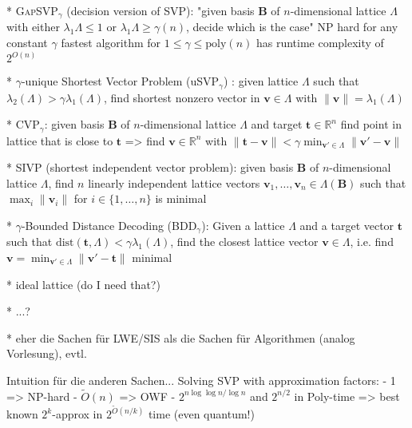 \documentclass[
  a4paper,  %
  twoside,  %
  bibliography=totoc,
  headsepline,
  cleardoublepage=empty,
  parskip=half,
  draft=false
]{scrbook}
\begin{document}
  * \textsc{GapSVP}$_\gamma$ (decision version of \textsc{SVP}): "given basis $\mathbf{B}$ of $n$-dimensional lattice $\Lambda$ with either $\lambda_1{\Lambda} \leq 1$ or $\lambda_1{\Lambda} \geq \gamma(n)$, decide which is the case" %
    NP hard for any constant $\gamma$ %
    fastest algorithm for $1\leq \gamma \leq \text{poly}(n)$ has runtime complexity of $2^{O(n)}$
  
  * $\gamma$-unique Shortest Vector Problem (uSVP$_\gamma$) \cite{LM09}: given lattice $\Lambda$ such that $\lambda_2(\Lambda) > \gamma \lambda_1(\Lambda)$, find shortest nonzero vector in $\mathbf{v} \in \Lambda$ with $\|\mathbf{v}\| = \lambda_1(\Lambda)$

  * CVP$_\gamma$: given  basis $\mathbf{B}$ of $n$-dimensional lattice $\Lambda$ and target $\mathbf{t}\in\mathbb{R}^n$ find point in lattice that is close to $\mathbf{t}$ => find  $\mathbf{v} \in \mathbb{R}^n$ with $\|\mathbf{t} - \mathbf{v}\| < \gamma \min_{\mathbf{v}' \in \Lambda} \|\mathbf{v}' - \mathbf{v}\|$

  * \textsc{SIVP} (shortest independent vector problem): given  basis $\mathbf{B}$ of $n$-dimensional lattice $\Lambda$, find $n$ linearly independent lattice vectors $\mathbf{v}_1, \ldots, \mathbf{v}_n \in \Lambda(\mathbf{B})$ such that $\max_i \|\mathbf{v}_i\|$ for $i \in \{1, \ldots, n\}$ is minimal

  * $\gamma$-Bounded Distance Decoding (BDD$_\gamma$): Given a lattice $\Lambda$ and a target vector $\mathbf{t}$ such that $\text{dist}(\mathbf{t}, \Lambda) < \gamma \lambda_1(\Lambda)$, find the closest lattice vector $\mathbf{v} \in \Lambda$, i.e. find $\mathbf{v} = \min_{\mathbf{v}' \in \Lambda} \|\mathbf{v}' - \mathbf{t}\|$ minimal \cite{LM09}


  * ideal lattice (do I need that?)

  * ...?

  * eher die Sachen für LWE/SIS als die Sachen für Algorithmen (analog Vorlesung), evtl. 
  
  Intuition für die anderen Sachen...
  Solving SVP with approximation factors: %
        - 1 => NP-hard \cite{Ajt98}
        - $\tilde{O}(n)$ => OWF \cite{Ajt96, MR04}
        - $2^{n \log \log n / \log n}$ and $2^{n/2}$ in Poly-time \cite{LLL82}
        => best known $2^k$-approx in $2^{\tilde{O}(n/k)}$ time (even quantum!)
\end{document}
